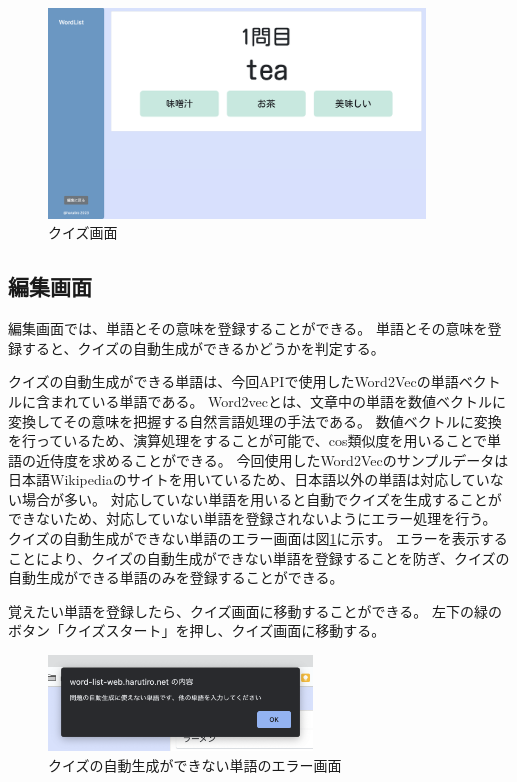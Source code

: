 \documentclass[11pt,a4paper]{jsarticle}
\begin{document}
\begin{figure}[htbp]
    \begin{center}
        \includegraphics[width=100mm]{./img/quiz_screen.png}
    \end{center}
    \caption{クイズ画面}
\end{figure}

\subsection{編集画面}
編集画面では、単語とその意味を登録することができる。
単語とその意味を登録すると、クイズの自動生成ができるかどうかを判定する。

クイズの自動生成ができる単語は、今回APIで使用したWord2Vecの単語ベクトルに含まれている単語である。
Word2vecとは、文章中の単語を数値ベクトルに変換してその意味を把握する自然言語処理の手法である。
数値ベクトルに変換を行っているため、演算処理をすることが可能で、cos類似度を用いることで単語の近侍度を求めることができる。
今回使用したWord2Vecのサンプルデータは日本語Wikipediaのサイトを用いているため、日本語以外の単語は対応していない場合が多い。
対応していない単語を用いると自動でクイズを生成することができないため、対応していない単語を登録されないようにエラー処理を行う。
クイズの自動生成ができない単語のエラー画面は図\ref{fig:quiz_error}に示す。
エラーを表示することにより、クイズの自動生成ができない単語を登録することを防ぎ、クイズの自動生成ができる単語のみを登録することができる。

覚えたい単語を登録したら、クイズ画面に移動することができる。
左下の緑のボタン「クイズスタート」を押し、クイズ画面に移動する。

\begin{figure}[htbp]
    \begin{center}
        \includegraphics[width=70mm]{./img/error_popup.png}
    \end{center}
    \caption{クイズの自動生成ができない単語のエラー画面}
    \label{fig:quiz_error}
\end{figure}
\end{document}
